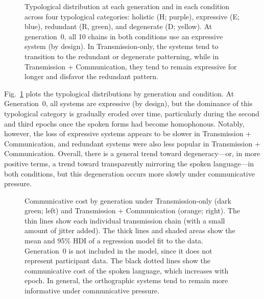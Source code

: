 \documentclass[doc,biblatex]{apa7}
\begin{document}
	\begin{figure}
	\vspace*{2pt}
	\caption{Typological distribution at each generation and in each condition across four typological categories: holistic (H; purple), expressive (E; blue), redundant (R, green), and degenerate (D; yellow). At generation~0, all 10 chains in both conditions use an expressive system (by design). In Transmission-only, the systems tend to transition to the redundant or degenerate patterning, while in Transmission + Communication, they tend to remain expressive for longer and disfavor the redundant pattern.}
	\label{typ_dist_con}
	\end{figure}

Fig.~\ref{typ_dist_con} plots the typological distributions by generation and condition. At Generation~0, all systems are expressive (by design), but the dominance of this typological category is gradually eroded over time, particularly during the second and third epochs once the spoken forms had become homophonous. Notably, however, the loss of expressive systems appears to be slower in Transmission + Communication, and redundant systems were also less popular in Transmission + Communication. Overall, there is a general trend toward degeneracy---or, in more positive terms, a trend toward transparently mirroring the spoken language---in both conditions, but this degeneration occurs more slowly under communicative pressure.

	\begin{figure}
	\vspace*{2pt}
	\caption{Communicative cost by generation under Transmission-only (dark green; left) and Transmission + Communication (orange; right). The thin lines show each individual transmission chain (with a small amount of jitter added). The thick lines and shaded areas show the mean and 95\% HDI of a regression model fit to the data. Generation~0 is not included in the model, since it does not represent participant data. The black dotted lines show the communicative cost of the spoken language, which increases with epoch. In general, the orthographic systems tend to remain more informative under communicative pressure.}
	\label{cost_con}
	\end{figure}
\end{document}
